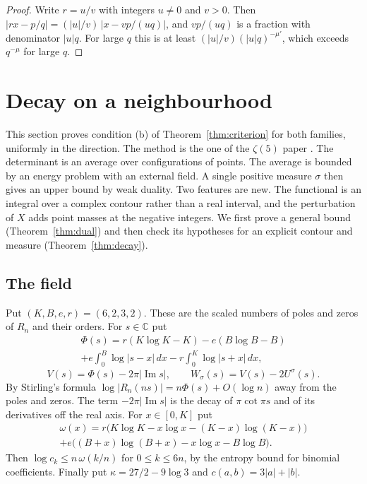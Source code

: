 \documentclass[11pt]{amsart}
\theoremstyle{definition}
\theoremstyle{remark}
\numberwithin{equation}{section}
\newcommand{\C}{\mathbb C}
\begin{document}
\begin{proof}
Write $r=u/v$ with integers $u\ne0$ and $v>0$. Then $|rx-p/q|=(|u|/v)\,|x-vp/(uq)|$, and $vp/(uq)$ is a fraction
with denominator $|u|q$. For large $q$ this is at least $(|u|/v)(|u|q)^{-\mu'}$, which exceeds $q^{-\mu}$ for large
$q$.
\end{proof}


\section{Decay on a neighbourhood}\label{sec:decay}

This section proves condition (b) of Theorem~\ref{thm:criterion} for both families, uniformly in the direction. The
method is the one of the $\zeta(5)$ paper \cite{Litsey2026c}. The determinant is an average over configurations of
points. The average is bounded by an energy problem with an external field. A single positive measure $\sigma$ then
gives an upper bound by weak duality. Two features are new. The functional is an integral over a complex contour
rather than a real interval, and the perturbation of $X$ adds point masses at the negative integers. We first prove a
general bound (Theorem~\ref{thm:dual}) and then check its hypotheses for an explicit contour and measure
(Theorem~\ref{thm:decay}).

\subsection{The field}
Put $(K,B,e,r)=(6,2,3,2)$. These are the scaled numbers of poles and zeros of $R_n$ and their orders. For $s\in\C$ put
\begin{multline*}
 \Phi(s)=r(K\log K-K)-e(B\log B-B)\\
 +e\int_0^B\log|s-x|\,dx-r\int_0^K\log|s+x|\,dx,
\end{multline*}
\[
 V(s)=\Phi(s)-2\pi|\operatorname{Im}s|,\qquad W_\sigma(s)=V(s)-2U^\sigma(s).
\]
By Stirling's formula $\log|R_n(ns)|=n\Phi(s)+O(\log n)$ away from the poles and zeros. The term $-2\pi|\operatorname{Im}s|$
is the decay of $\pi\cot\pi s$ and of its derivatives off the real axis. For $x\in[0,K]$ put
\begin{multline*}
 \omega(x)=r\bigl(K\log K-x\log x-(K-x)\log(K-x)\bigr)\\
 +e\bigl((B+x)\log(B+x)-x\log x-B\log B\bigr).
\end{multline*}
Then $\log c_k\le n\,\omega(k/n)$ for $0\le k\le6n$, by the entropy bound for binomial coefficients. Finally put
$\kappa=27/2-9\log3$ and $c(a,b)=3|a|+|b|$.
\end{document}
